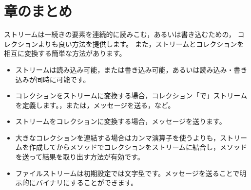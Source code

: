 \documentclass[a4paper,10pt,twoside]{book}
\begin{document}
\section{章のまとめ}

ストリームは一続きの要素を連続的に読みこむ，あるいは書き込むための，
コレクションよりも良い方法を提供します。
また，ストリームとコレクションを相互に変換する簡単な方法があります。
\begin{itemize}
  \item ストリームは読み込み可能，または書き込み可能，あるいは読み込み・書き込みが同時に可能です。
  \item コレクションをストリームに変換する場合，コレクション「で」ストリームを定義します。，または，メッセージを送る，など。
  \item ストリームをコレクションに変換する場合，メッセージを送ります。
  \item 大きなコレクションを連結する場合はカンマ演算子を使うよりも，ストリームを作成してからメソッドでコレクションをストリームに結合し，メソッドを送って結果を取り出す方法が有効です。
  \item ファイルストリームは初期設定では文字型です。メッセージを送ることで明示的にバイナリにすることができます。
\end{itemize}

\ifx\wholebook\relax\else
\end{document}
